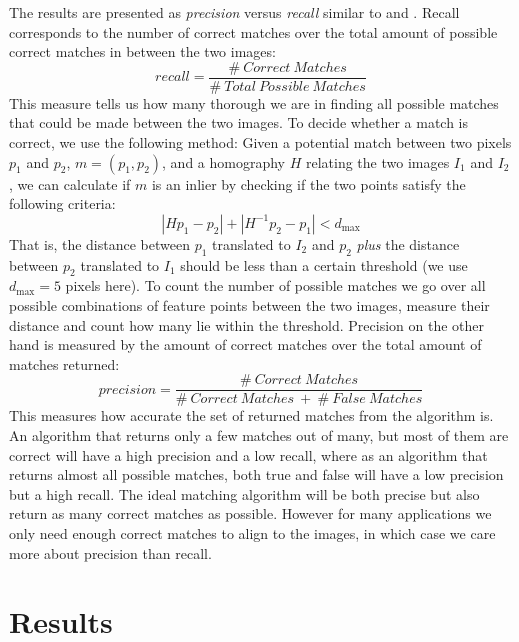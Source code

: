 The results are presented as \emph{precision} versus \emph{recall} 
similar to \cite{ke2004pca} and \cite{mikolajczyk2005performance}.  
Recall corresponds to the number of correct matches over the total 
amount of possible correct matches in between the two images:
\begin{equation*}
	recall = \frac{\# ~ Correct ~ Matches}{\# ~ Total ~ Possible ~ 
	Matches}
\end{equation*}
This measure tells us how many thorough we are in finding all possible 
matches that could be made between the two images. To decide whether a 
match is correct, we use the following method:
Given a potential match between two pixels $p_1$ and $p_2$, $m = 
\left(p_1, p_2\right)$, and a homography $H$ relating the two images 
$I_1$ and $I_2$, we can calculate if $m$ is an inlier by checking if the 
two points satisfy the following criteria:
\begin{equation*}
\left\vert H p_1 - p_2 \right\vert + \left\vert H^{-1}p_2 - p_1 \right\vert < d_{\max}
\end{equation*}
That is, the distance between $p_1$ translated to $I_2$ and $p_2$ 
\emph{plus} the distance between $p_2$ translated to $I_1$ should be 
less than a certain threshold (we use $d_{\max}=5$ pixels here). To 
count the number of possible matches we go over all possible 
combinations of feature points between the two images, measure their 
distance and count how many lie within the threshold.
Precision on the other hand is measured by the amount of correct matches
over the total amount of matches returned:
\begin{equation*}
	precision = \frac{\# ~ Correct ~ Matches}{\# ~ Correct ~ Matches ~ + 
	~ \# ~ False ~ Matches}
\end{equation*}
This measures how accurate the set of returned matches from the 
algorithm is. An algorithm that returns only a few matches out of many, 
but most of them are correct will have a high precision and a low 
recall, where as an algorithm that returns almost all possible matches, 
both true and false will have a low precision but a high recall. The 
ideal matching algorithm will be both precise but also return as many 
correct matches as possible. However for many applications we only need 
enough correct matches to align to the images, in which case we care 
more about precision than recall. 


\section{Results}
\label{S:Results}

